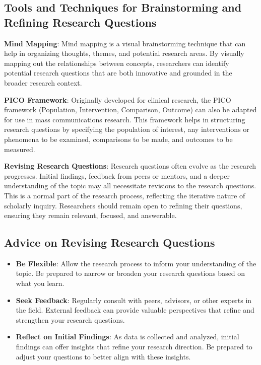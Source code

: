 \documentclass[
]{book}
\providecommand{\tightlist}{%
  \setlength{\itemsep}{0pt}\setlength{\parskip}{0pt}}
\begin{document}
\hypertarget{tools-and-techniques-for-brainstorming-and-refining-research-questions}{%
\subsection*{Tools and Techniques for Brainstorming and Refining Research Questions}\label{tools-and-techniques-for-brainstorming-and-refining-research-questions}}

\textbf{Mind Mapping}: Mind mapping is a visual brainstorming technique that can help in organizing thoughts, themes, and potential research areas. By visually mapping out the relationships between concepts, researchers can identify potential research questions that are both innovative and grounded in the broader research context.

\textbf{PICO Framework}: Originally developed for clinical research, the PICO framework (Population, Intervention, Comparison, Outcome) can also be adapted for use in mass communications research. This framework helps in structuring research questions by specifying the population of interest, any interventions or phenomena to be examined, comparisons to be made, and outcomes to be measured.

\textbf{Revising Research Questions}: Research questions often evolve as the research progresses. Initial findings, feedback from peers or mentors, and a deeper understanding of the topic may all necessitate revisions to the research questions. This is a normal part of the research process, reflecting the iterative nature of scholarly inquiry. Researchers should remain open to refining their questions, ensuring they remain relevant, focused, and answerable.

\hypertarget{advice-on-revising-research-questions}{%
\subsection*{Advice on Revising Research Questions}\label{advice-on-revising-research-questions}}

\begin{itemize}
\tightlist
\item
  \textbf{Be Flexible}: Allow the research process to inform your understanding of the topic. Be prepared to narrow or broaden your research questions based on what you learn.
\item
  \textbf{Seek Feedback}: Regularly consult with peers, advisors, or other experts in the field. External feedback can provide valuable perspectives that refine and strengthen your research questions.
\item
  \textbf{Reflect on Initial Findings}: As data is collected and analyzed, initial findings can offer insights that refine your research direction. Be prepared to adjust your questions to better align with these insights.
\end{itemize}
\end{document}
